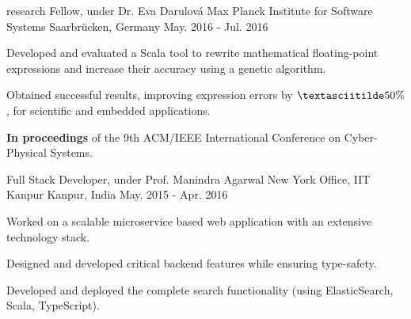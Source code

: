 \begin{cventries}
  \cventry
  {research Fellow, under Dr. Eva Darulová} %
  {Max Planck Institute for Software Systems} %
  {Saarbrücken, Germany} %
  {May. 2016 - Jul. 2016} %
  {
    \begin{cvitems}
    \setlength\itemsep{0.1cm}
    \item {Developed and evaluated a Scala tool to rewrite
    mathematical floating-point expressions and increase their
    accuracy using a genetic algorithm.}
    \item {Obtained successful results, improving expression errors by
    $\textasciitilde50\%$, for scientific and embedded
    applications.}
    \item {\textbf{In proceedings} of the 9th ACM/IEEE International Conference on Cyber-Physical Systems.}
    \end{cvitems}
  }

  \cventry
  {Full Stack Developer, under Prof. Manindra Agarwal}
  {New York Office, IIT Kanpur}
  {Kanpur, India}
  {May. 2015 - Apr. 2016}
  {
    \begin{cvitems}
    \setlength\itemsep{0.1cm}
    \item Worked on a scalable microservice based web application with an extensive technology stack.
    \item Designed and developed critical backend features while
      ensuring type-safety.
    \item Developed and deployed the complete search functionality
      (using ElasticSearch, Scala, TypeScript).
    \end{cvitems}
  }

\end{cventries}

